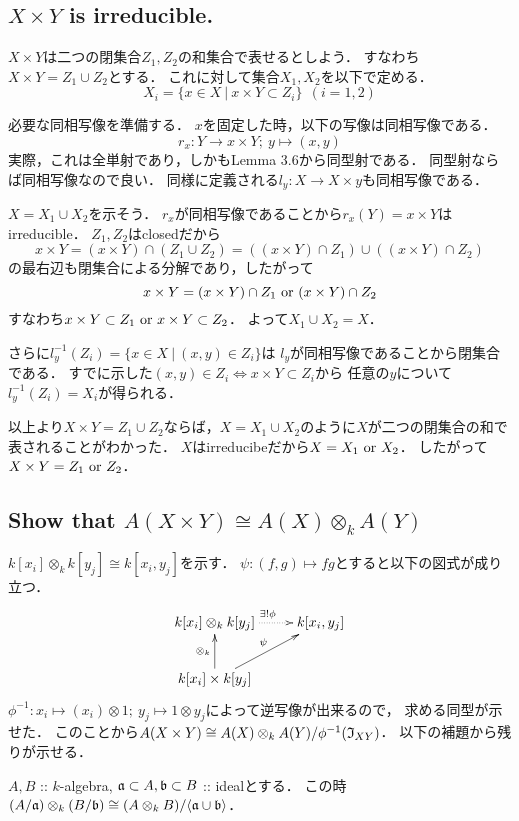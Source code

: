 \documentclass[a4paper]{jarticle}
\begin{document}
    \subsection{$X \times Y$ is irreducible.}
    $X \times Y$は二つの閉集合$Z_1, Z_2$の和集合で表せるとしよう．
    すなわち$X \times Y=Z_1 \cup Z_2$とする．
    これに対して集合$X_1, X_2$を以下で定める．
    \[ X_i=\{ x \in X ~|~ x \times Y \subset Z_i \} ~~(i=1,2) \]

    必要な同相写像を準備する．
    $x$を固定した時，以下の写像は同相写像である．
    \[ r_x: Y \to x \times Y;~ y \mapsto (x,y) \]
    実際，これは全単射であり，しかもLemma 3.6から同型射である．
    同型射ならば同相写像なので良い．
    同様に定義される$l_y:X \to X \times y$も同相写像である．

    $X=X_1 \cup X_2$を示そう．
    $r_x$が同相写像であることから$r_x(Y)=x \times Y$はirreducible．
    $Z_1, Z_2$はclosedだから
    \[ x \times Y=(x \times Y) \cap (Z_1 \cup Z_2)=((x \times Y) \cap Z_1) \cup ((x \times Y) \cap Z_2) \]
    の最右辺も閉集合による分解であり，したがって
    \[ x \times Y=(x \times Y) \cap Z_1 \text{ or } (x \times Y) \cap Z_2  \]
    すなわち$x \times Y \subset Z_1 \text{ or } x \times Y \subset Z_2$．
    よって$X_1 \cup X_2=X$．

    さらに$l_y^{-1}(Z_i)=\{ x \in X ~|~ (x,y) \in Z_i\}$は
    $l_y$が同相写像であることから閉集合である．
    すでに示した$(x,y) \in Z_i \iff x \times Y \subset Z_i$から
    任意の$y$について$l_y^{-1}(Z_i)=X_i$が得られる．
    
    以上より$X \times Y=Z_1 \cup Z_2$ならば，$X=X_1 \cup X_2$のように$X$が二つの閉集合の和で表されることがわかった．
    $X$はirreducibeだから$X=X_1 \text{ or } X_2$．
    したがって$X \times Y=Z_1 \text{ or } Z_2$．

    \subsection{Show that $A(X \times Y) \cong A(X) \otimes_k A(Y)$}
    $k[x_i] \otimes_k k[y_j] \cong k[x_i,y_j]$を示す．
    $\psi: (f,g) \mapsto fg$とすると以下の図式が成り立つ．
    \[
        \xymatrix
        {
        k[x_i] \otimes_k k[y_j] \ar@{..>}[r]^{\exists ! \phi} & k[x_i,y_j]\\
        k[x_i] \times k[y_j] \ar[u]^{\otimes_k} \ar[ur]^{\psi}
        }
    \]
    $\phi^{-1}: x_i \mapsto (x_i) \otimes 1;~ y_j \mapsto 1 \otimes y_j$によって逆写像が出来るので，
    求める同型が示せた．
    このことから$A(X \times Y) \cong A(X) \otimes_k A(Y)/\phi^{-1}(\mathfrak{I}_{XY})$．
    以下の補題から残りが示せる．
    \begin{Lemma}
        $A,B$ :: $k$-algebra, $\mathfrak{a} \subset A, \mathfrak{b} \subset B$ :: idealとする．
        この時$(A/\mathfrak{a}) \otimes_k (B/\mathfrak{b}) \cong (A \otimes_k B)/\langle \mathfrak{a} \cup \mathfrak{b} \rangle$．
    \end{Lemma}
\end{document}
